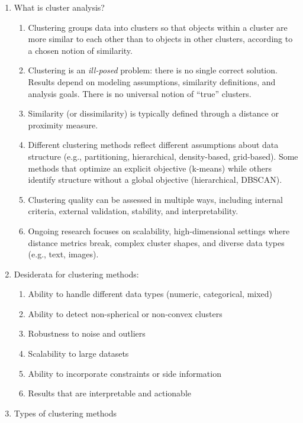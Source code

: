 \documentclass{article}
\begin{document}
\begin{enumerate}
\item What is cluster analysis?
\begin{enumerate}
\item Clustering groups data into clusters so that objects within a cluster are more similar to each other than to objects in other clusters, according to a chosen notion of similarity.
\item Clustering is an \emph{ill-posed} problem: there is no single correct solution. Results depend on modeling assumptions, similarity definitions, and analysis goals. There is no universal notion of “true” clusters.
\item Similarity (or dissimilarity) is typically defined through a distance or proximity measure.
\item Different clustering methods reflect different assumptions about data structure (e.g., partitioning, hierarchical, density-based, grid-based). Some methods that optimize an explicit objective (k-means) while others identify structure without a global objective (hierarchical, DBSCAN).
\item Clustering quality can be assessed in multiple ways, including internal criteria, external validation, stability, and interpretability.
\item Ongoing research focuses on scalability, high-dimensional settings where distance metrics break, complex cluster shapes, and diverse data types (e.g., text, images).
\end{enumerate}

\item Desiderata for clustering methods:
\begin{enumerate}
\item Ability to handle different data types (numeric, categorical, mixed)
\item Ability to detect non-spherical or non-convex clusters
\item Robustness to noise and outliers
\item Scalability to large datasets
\item Ability to incorporate constraints or side information
\item Results that are interpretable and actionable
\end{enumerate}

\item Types of clustering methods
\begin{enumerate}


\end{enumerate}
\end{enumerate}
\end{document}
